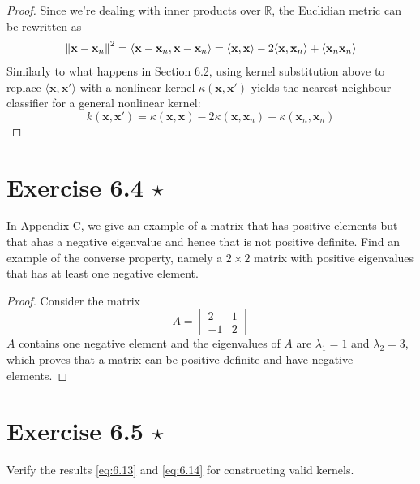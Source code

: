 \vspace{1em}

\begin{proof}
    Since we're dealing with inner products over $\mathbb{R}$,
    the Euclidian metric can be rewritten as
    \begin{align*}
        \norm{\mathbf{x} - \mathbf{x}_n}^2
        = \langle \mathbf{x} - \mathbf{x}_n, \mathbf{x} - \mathbf{x}_n\rangle
        = \langle\mathbf{x}, \mathbf{x}\rangle - 2\langle \mathbf{x}, \mathbf{x}_n \rangle
        + \langle \mathbf{x}_n \mathbf{x}_n \rangle
    \end{align*}
    Similarly to what happens in Section 6.2, using kernel
    substitution above to replace $\langle \mathbf{x}, \mathbf{x}' \rangle$ with
    a nonlinear kernel $\kappa(\mathbf{x}, \mathbf{x}')$ yields the
    nearest-neighbour classifier for a general nonlinear kernel:
    \[
        k(\mathbf{x}, \mathbf{x}') 
        = \kappa(\mathbf{x}, \mathbf{x}) - 2\kappa(\mathbf{x}, \mathbf{x}_n)
        + \kappa(\mathbf{x}_n, \mathbf{x}_n)
    \] 
\end{proof}

\section*{Exercise 6.4 $\star$}
In Appendix C, we give an example of a matrix that has positive elements
but that ahas a negative eigenvalue and hence that is not positive
definite. Find an example of the converse property, namely a $2 \times 2$ 
matrix with positive eigenvalues that has at least one negative element.

\vspace{1em}

\begin{proof}
    Consider the matrix 
    \[
        A = 
        \begin{bmatrix}
            2 & 1 \\
            -1 & 2
        \end{bmatrix}
    \] 
    $A$ contains one negative element and the eigenvalues of $A$ 
    are $\lambda_1 = 1$ and $\lambda_2 = 3$, which proves that
    a matrix can be positive definite and have negative elements.
\end{proof}

\section*{Exercise 6.5 $\star$}
Verify the results \eqref{eq:6.13} and \eqref{eq:6.14} for constructing valid kernels.

